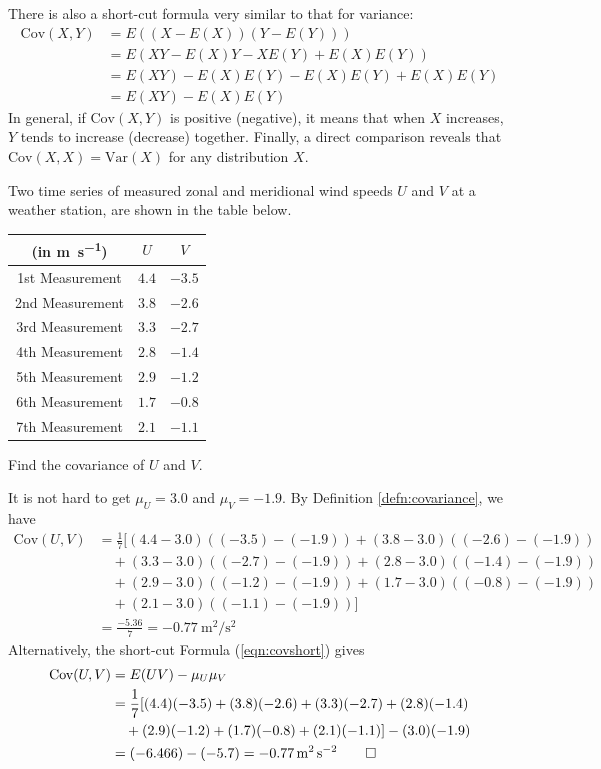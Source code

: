 There is also a short-cut formula very similar to that for variance:
\begin{align}
\text{Cov}(X,Y) &= E((X-E(X))(Y-E(Y))) \nonumber \\
&= E(XY - E(X)Y - XE(Y) + E(X)E(Y)) \nonumber \\
&= E(XY) - E(X)E(Y) - E(X)E(Y) + E(X)E(Y) \nonumber \\
&= E(XY) - E(X)E(Y) \label{eqn:covshort}
\end{align}
In general, if $\text{Cov}(X,Y)$ is positive (negative), it means that when $X$ increases, $Y$ tends to increase (decrease) together. Finally, a direct comparison reveals that $\text{Cov}(X,X) = \text{Var}(X)$ for any distribution $X$. 

\begin{exmp}
Two time series of measured zonal and meridional wind speeds $U$ and $V$ at a weather station, are shown in the table below.
\begin{center}
\begin{tabular}{|c|c|c|}
\hline
(in \si{\m \per \s}) & $U$ & $V$\\
\hline
1st Measurement & $4.4$ & $-3.5$ \\
\hline
2nd Measurement & $3.8$ & $-2.6$ \\
\hline
3rd Measurement & $3.3$ & $-2.7$ \\
\hline
4th Measurement & $2.8$ & $-1.4$ \\
\hline
5th Measurement & $2.9$ & $-1.2$ \\
\hline
6th Measurement & $1.7$ & $-0.8$ \\
\hline
7th Measurement & $2.1$ & $-1.1$ \\
\hline
\end{tabular}
\end{center}
Find the covariance of $U$ and $V$.
\end{exmp}
\begin{solution}
It is not hard to get $\mu_U = 3.0$ and $\mu_V = -1.9$. By Definition \ref{defn:covariance}, we have
\begin{align*}
\text{Cov}(U,V) &= \frac{1}{7} [(4.4-3.0)((-3.5)-(-1.9))+(3.8-3.0)((-2.6)-(-1.9)) \\
&\quad+(3.3-3.0)((-2.7)-(-1.9))+(2.8-3.0)((-1.4)-(-1.9)) \\
&\quad+(2.9-3.0)((-1.2)-(-1.9))+(1.7-3.0)((-0.8)-(-1.9)) \\
&\quad+(2.1-3.0)((-1.1)-(-1.9))] \\
&= \frac{-5.36}{7} = \SI{-0.77}{\square\m \per \square\s}
\end{align*}
Alternatively, the short-cut Formula (\ref{eqn:covshort}) gives
\begin{align*}
\text{Cov}(U,V) &= E(UV) - \mu_U \mu_V \\
&= \frac{1}{7}[(4.4)(-3.5) + (3.8)(-2.6) + (3.3)(-2.7) + (2.8)(-1.4) \\
&\quad + (2.9)(-1.2) + (1.7)(-0.8) + (2.1)(-1.1)] - (3.0)(-1.9) \\
&= (-6.466) - (-5.7) = \SI{-0.77}{\square\m \per \square\s} \qedhere
\end{align*}
\end{solution}

